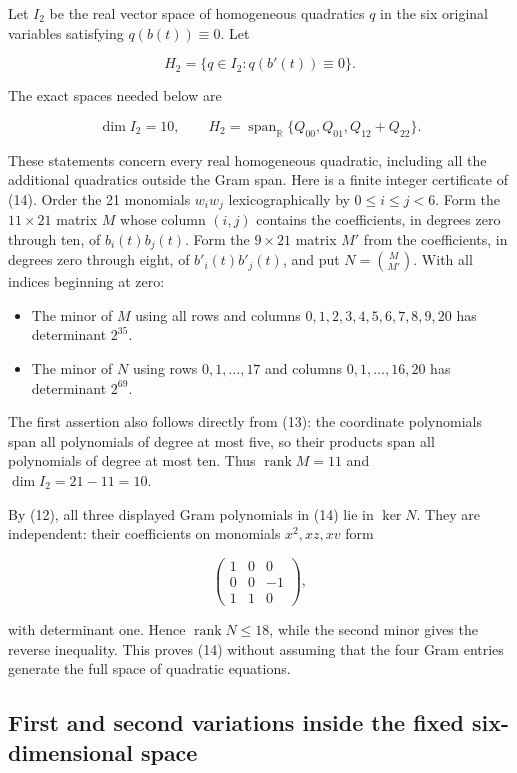 \documentclass[11pt]{article}
\begin{document}
Let \(I_2\) be the real vector space of homogeneous quadratics \(q\) in the
six original variables satisfying \(q(b(t))\equiv0\). Let

\[
H_2=\{q\in I_2:q(b'(t))\equiv0\}.
\]

The exact spaces needed below are

\[
\dim I_2=10,\qquad
H_2=\operatorname{span}_{\mathbb R}\{Q_{00},Q_{01},Q_{12}+Q_{22}\}.
\tag{14}
\]

These statements concern every real homogeneous quadratic, including all
the additional quadratics outside the Gram span. Here is a finite integer
certificate of (14). Order the 21 monomials \(w_iw_j\) lexicographically by
\(0\le i\le j<6\). Form the \(11\times21\) matrix \(M\) whose column
\((i,j)\) contains the coefficients, in degrees zero through ten, of
\(b_i(t)b_j(t)\). Form the \(9\times21\) matrix \(M'\) from the coefficients,
in degrees zero through eight, of \(b'_i(t)b'_j(t)\), and put
\(N=\binom{M}{M'}\). With all indices beginning at zero:

\begin{itemize}
\item The minor of \(M\) using all rows and columns
  \(0,1,2,3,4,5,6,7,8,9,20\) has determinant \(2^{35}\).
\item The minor of \(N\) using rows \(0,1,\ldots,17\) and columns
  \(0,1,\ldots,16,20\) has determinant \(2^{69}\).
\end{itemize}

The first assertion also follows directly from (13): the coordinate
polynomials span all polynomials of degree at most five, so their products
span all polynomials of degree at most ten. Thus \(\operatorname{rank}M=11\)
and \(\dim I_2=21-11=10\).

By (12), all three displayed Gram polynomials in (14) lie in \(\ker N\).
They are independent: their coefficients on monomials \(x^2,xz,xv\) form

\[
\begin{pmatrix}1&0&0\\0&0&-1\\1&1&0\end{pmatrix},
\]

with determinant one. Hence \(\operatorname{rank}N\le18\), while the second
minor gives the reverse inequality. This proves (14) without assuming that
the four Gram entries generate the full space of quadratic equations.

\subsection{First and second variations inside the fixed six-dimensional space}
\end{document}

